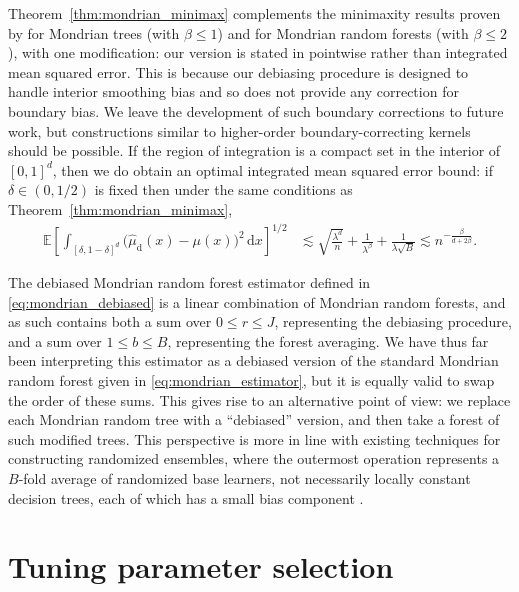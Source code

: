 \documentclass[11pt,lof]{puthesis}
\newcommand{\E}{\ensuremath{\mathbb{E}}}
\newcommand{\rd}{\ensuremath{\mathrm{d}}}
\newcommand{\diff}[1]{\,\mathrm{d}#1}
\theoremstyle{break}
\theoremstyle{proof}
\begin{document}
Theorem~\ref{thm:mondrian_minimax} complements the minimaxity results proven by
\citet{mourtada2020minimax} for Mondrian trees (with $\beta \leq 1$) and for
Mondrian random forests (with $\beta \leq 2$), with one modification: our
version is stated in pointwise rather than integrated mean squared error. This
is because our debiasing procedure is designed to handle interior smoothing
bias and so does not provide any correction for boundary bias. We leave
the development of such boundary corrections to future work, but constructions
similar to higher-order boundary-correcting kernels should be possible. If the
region of integration is a compact set in the interior of $[0,1]^d$, then we do
obtain an optimal integrated mean squared error bound: if $\delta \in (0, 1/2)$
is fixed then under the same conditions as Theorem~\ref{thm:mondrian_minimax},
%
\begin{align*}
  \E \left[
    \int_{[\delta, 1-\delta]^d}
    \big(
      \hat \mu_\rd(x)
      - \mu(x)
    \big)^2
    \diff x
  \right]^{1/2}
  &\lesssim
  \sqrt{\frac{\lambda^d}{n}}
  + \frac{1}{\lambda^\beta}
  + \frac{1}{\lambda \sqrt B}
  \lesssim
  n^{-\frac{\beta}{d + 2 \beta}}.
\end{align*}

The debiased Mondrian random forest estimator defined in
\eqref{eq:mondrian_debiased} is
a linear combination of Mondrian random forests, and as such contains both a
sum over $0 \leq r \leq J$, representing the debiasing procedure, and a sum
over $1 \leq b \leq B$, representing the forest averaging. We have thus far
been interpreting this estimator as a debiased version of the standard Mondrian
random forest given in \eqref{eq:mondrian_estimator}, but it is
equally valid to swap the order of these sums. This gives rise to an
alternative point of view: we replace each Mondrian random tree with a
``debiased'' version, and then take a forest of such modified trees. This
perspective is more in line with existing techniques for constructing
randomized ensembles, where the outermost operation represents a $B$-fold
average of randomized base learners, not necessarily locally constant decision
trees, each of which has a small bias component \citep{caruana2004ensemble,
zhou2019deep, friedberg2020local}.

\section{Tuning parameter selection}%
\label{sec:mondrian_parameter_selection}
\end{document}
